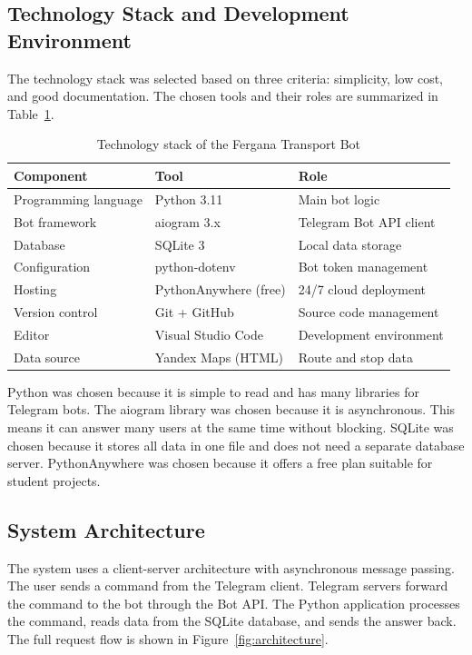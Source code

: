 \subsection{Technology Stack and Development Environment}
\label{subsec:stack}

The technology stack was selected based on three criteria: simplicity, low
cost, and good documentation. The chosen tools and their roles are
summarized in Table~\ref{tab:stack}.

\begin{table}[h]
\centering
\caption{Technology stack of the Fergana Transport Bot}
\label{tab:stack}
\begin{tabular}{lll}
\hline
\textbf{Component} & \textbf{Tool} & \textbf{Role} \\
\hline
Programming language & Python 3.11 & Main bot logic \\
Bot framework & aiogram 3.x & Telegram Bot API client \\
Database & SQLite 3 & Local data storage \\
Configuration & python-dotenv & Bot token management \\
Hosting & PythonAnywhere (free) & 24/7 cloud deployment \\
Version control & Git + GitHub & Source code management \\
Editor & Visual Studio Code & Development environment \\
Data source & Yandex Maps (HTML) & Route and stop data \\
\hline
\end{tabular}
\end{table}

Python was chosen because it is simple to read and has many libraries for
Telegram bots. \cite{lutz2013python} The aiogram library was chosen because it is asynchronous.
This means it can answer many users at the same time without blocking.\cite{aiogram_docs} SQLite
was chosen because it stores all data in one file and does not need a
separate database server. PythonAnywhere was chosen because it offers a free
plan suitable for student projects.  \cite{sqlite_docs} \cite{pythonanywhere}

\subsection{System Architecture}
\label{subsec:architecture}

The system uses a client-server architecture with asynchronous message
passing. The user sends a command from the Telegram client. Telegram servers
forward the command to the bot through the Bot API. The Python application
processes the command, reads data from the SQLite database, and sends the
answer back. The full request flow is shown in Figure~\ref{fig:architecture}.

